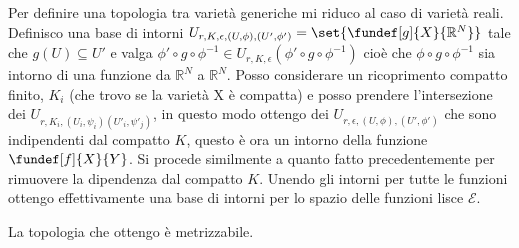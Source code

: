 
\begin{defn}
Per definire una topologia tra varietà generiche mi riduco al caso di varietà reali.
Definisco una base di intorni $U_{r, K, \epsilon, (U, \phi), (U', \phi')} = \set{\fundef[g]{X}{\mathbb{R}^{N}}}$ tale che $g(U) \subseteq U'$ e valga 
$\phi' \circ g \circ \phi^{-1} \in U_{r, K, \epsilon}(\phi' \circ g \circ \phi^{-1})$ cioè che $\phi \circ g \circ \phi^{-1}$ sia intorno di una funzione da $\mathbb{R}^{N}$ a $\mathbb{R}^{N}$.
Posso considerare un ricoprimento compatto finito,  ${K_i}$ (che trovo se la varietà X è compatta) e posso prendere l'intersezione dei $U_{r,K_i, (U_i, \psi_i)(U'_i, \psi'_j)}$, in questo modo ottengo
dei $U_{r, \epsilon, (U, \phi), (U', \phi')}$ che sono indipendenti dal compatto $K$, questo è ora un intorno della funzione $\fundef[f]{X}{Y}$. Si procede similmente a quanto fatto precedentemente 
per rimuovere la dipendenza dal compatto $K$.
Unendo gli intorni per tutte le funzioni ottengo effettivamente una base di intorni per lo spazio delle funzioni lisce $\mathcal{E}$.

\end{defn}

\begin{oss}
 La topologia che ottengo è metrizzabile.
\end{oss}


